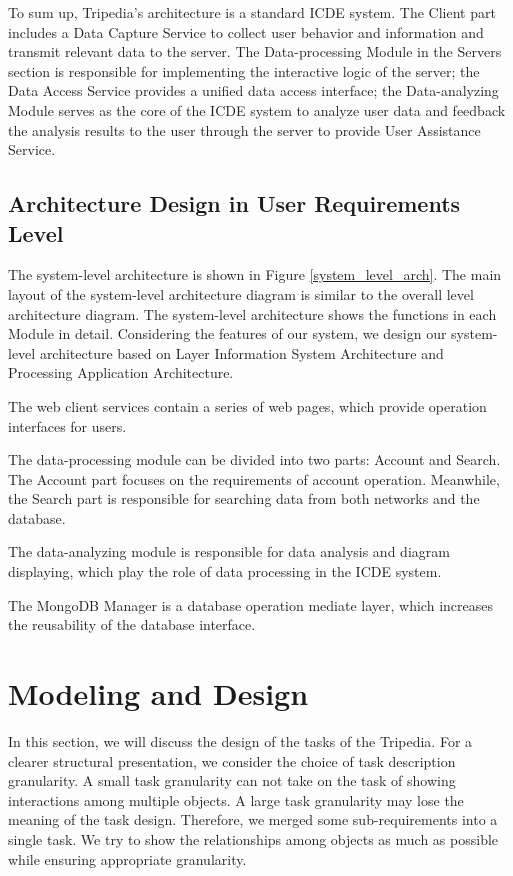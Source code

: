 \documentclass[conference]{IEEEtran}
\begin{document}
To sum up, Tripedia's architecture is a standard ICDE system. The Client part includes a Data Capture Service to collect user behavior and information and transmit relevant data to the server. The Data-processing Module in the Servers section is responsible for implementing the interactive logic of the server; the Data Access Service provides a unified data access interface; the Data-analyzing Module serves as the core of the ICDE system to analyze user data and feedback the analysis results to the user through the server to provide User Assistance Service.


\subsection{\textbf{Architecture Design in User Requirements Level}}

The system-level architecture is shown in Figure \ref{system_level_arch}. The main layout of the system-level architecture diagram is similar to the overall level architecture diagram. The system-level architecture shows the functions in each Module in detail. Considering the features of our system, we design our system-level architecture based on Layer Information System Architecture and Processing Application Architecture.

The web client services contain a series of web pages, which provide operation interfaces for users.

The data-processing module can be divided into two parts: Account and Search. The Account part focuses on the requirements of account operation. Meanwhile, the Search part is responsible for searching data from both networks and the database.

The data-analyzing module is responsible for data analysis and diagram displaying, which play the role of data processing in the ICDE system.

The MongoDB Manager is a database operation mediate layer, which increases the reusability of the database interface.

\section{\textbf{Modeling and Design}}

In this section, we will discuss the design of the tasks of the Tripedia. For a clearer structural presentation, we consider the choice of task description granularity. A small task granularity can not take on the task of showing interactions among multiple objects. A large task granularity may lose the meaning of the task design. Therefore, we merged some sub-requirements into a single task. We try to show the relationships among objects as much as possible while ensuring appropriate granularity. 
\end{document}
